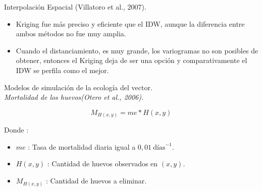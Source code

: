 \begin{frame}[c]{Interpolación Espacial (Villatoro et al., 2007).}
  \begin{center}
     \begin{itemize}
     \item Kriging fue más preciso y eficiente que el IDW, aunque la diferencia entre ambos métodos no fue muy amplia.

    \item Cuando el distanciamiento, es muy grande, los variogramas no son posibles de obtener, entonces el Kriging deja de ser una opción y comparativamente el IDW se perfila como el mejor.

    \end{itemize}
  \end{center}
\end{frame}
{
\begin{frame}[c]{Modelos de simulación de la ecología del vector.\\\textit{Mortalidad de los huevos(Otero et al., 2006).}}
  \begin{center}
      \begin{equation}
          M_{H(x,y)} = me * H(x,y)
      \end{equation}
  \end{center}
  Donde :
    \begin{itemize}
      \item $me$ : Tasa de mortalidad diaria igual a $0,01\  \text{días}^{-1}$.
      \item $H(x, y)$ : Cantidad de huevos observados en $(x,y)$.
      \item $M_{H(x,y)}$ : Cantidad de huevos a eliminar.
    \end{itemize}
\end{frame}
}

